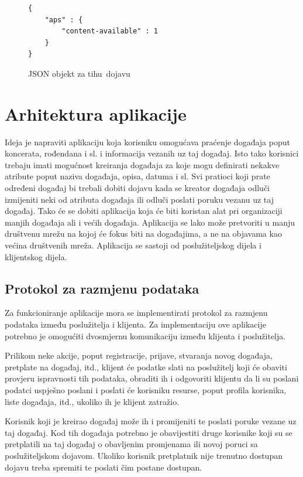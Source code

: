 \documentclass[times, utf8, zavrsni]{fer}
\begin{document}
\begin{figure}
\begin{lstlisting}
{
    "aps" : {
        "content-available" : 1
    }
}
\end{lstlisting}
\caption{JSON objekt za \glqq tihu\grqq\  dojavu}
\label{lst:tiha-dojava}
\end{figure}

\chapter{Arhitektura aplikacije}

Ideja je napraviti aplikaciju koja korisniku omogućava praćenje događaja poput koncerata, rođendana i sl. i informacija vezanih uz taj događaj. Isto tako korisnici trebaju imati mogućnost kreiranja događaja za koje mogu definirati nekakve atribute poput naziva događaja, opisa, datuma i sl. Svi pratioci koji prate određeni događaj bi trebali dobiti dojavu kada se kreator događaja odluči izmijeniti neki od atributa događaja ili odluči poslati poruku vezanu uz taj događaj. Tako će se dobiti aplikacija koja će biti koristan alat pri organizaciji manjih događaja ali i većih događaja. Aplikacija se lako može pretvoriti u manju društvenu mrežu na kojoj će fokus biti na događajima, a ne na objavama kao većina društvenih mreža. Aplikacija se sastoji od poslužiteljskog dijela i klijentskog dijela.

\section{Protokol za razmjenu podataka}

Za funkcioniranje aplikacije mora se implementirati protokol za razmjenu podataka između poslužitelja i klijenta. Za implementaciju ove aplikacije potrebno je omogućiti dvosmjernu komunikaciju između klijenta i poslužitelja.

Prilikom neke akcije, poput registracije, prijave, stvaranja novog događaja, pretplate na događaj, itd., klijent će podatke slati na poslužitelj koji će obaviti provjeru ispravnosti tih podataka, obraditi ih i odgovoriti klijentu da li su poslani podatci uspješno poslani i poslati će korisniku resurse, poput profila korisnika, liste događaja, itd., ukoliko ih je klijent zatražio.

Korisnik koji je kreirao događaj može ih i promijeniti te poslati poruke vezane uz taj događaj. Kod tih događaja potrebno je obavijestiti druge korisnike koji su se pretplatili na taj događaj o obavljenim promjenama ili novoj poruci sa poslužiteljskom dojavom. Ukoliko korisnik pretplatnik nije trenutno dostupan dojavu treba spremiti te poslati čim postane dostupan.
\end{document}
